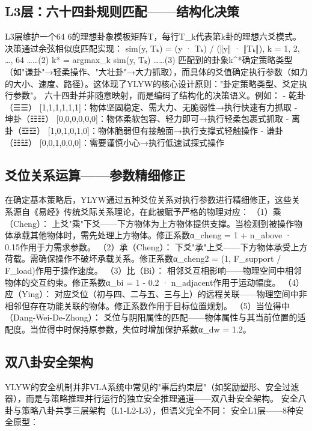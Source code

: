 \documentclass[12pt,a4paper]{article}
\begin{document}
\subsection{L3层：六十四卦规则匹配——结构化决策}
L3层维护一个64  6的理想卦象模板矩阵T，每行T\_k代表第k卦的理想六爻模式。决策通过余弦相似度匹配实现：
sim(y, Tₖ) = (y · Tₖ) / (‖y‖ · ‖Tₖ‖),  k = 1, 2, …, 64  ……(2)
k* = argmax\_k sim(y, Tₖ)  ……(3)
匹配到的卦象k^*确定策略类型（如"谦卦"→轻柔操作、"大壮卦"→大力抓取），而具体的爻值确定执行参数（如力的大小、速度、路径）。这体现了YLYW的核心设计原则："卦定策略类型、爻定执行参数"。
六十四卦并非随意映射，而是编码了结构化的决策语义。例如：
- 乾卦（☰☰） [1,1,1,1,1,1]：物体坚固稳定、需大力、无脆弱性→执行快速有力抓取
- 坤卦（☷☷） [0,0,0,0,0,0]：物体柔软包容、轻力即可→执行轻柔包裹式抓取
- 离卦（☲☲） [1,0,1,0,1,0]：物体脆弱但有接触面→执行支撑式轻触操作
- 谦卦（☷☳） [0,0,1,0,0,0]：需要谨慎小心→执行低速试探式操作

\subsection{爻位关系运算——参数精细修正}
在确定基本策略后，YLYW通过五种爻位关系对执行参数进行精细修正，这些关系源自《易经》传统爻际关系理论，在此被赋予严格的物理对应：
（1）乘（Cheng）： 上爻"乘"下爻——下方物体为上方物体提供支撑。当检测到被操作物体承载其他物体时，需先处理上方物体。修正系数α\_cheng = 1 + n\_above · 0.15作用于力需求参数。
（2）承（Cheng）： 下爻"承"上爻——下方物体承受上方荷载。需确保操作不破坏承载关系。修正系数α\_cheng2 = (1, F\_support / F\_load)作用于操作速度。
（3）比（Bi）： 相邻爻互相影响——物理空间中相邻物体的交互约束。修正系数α\_bi = 1 - 0.2 · n\_adjacent作用于运动幅度。
（4）应（Ying）： 对应爻位（初与四、二与五、三与上）的远程关联——物理空间中非相邻但存在功能关联的物体。修正系数作用于目标位置规划。
（5）当位得中（Dang-Wei-De-Zhong）： 爻位与阴阳属性的匹配——物体属性与其当前位置的适配度。当位得中时保持原参数，失位时增加保护系数α\_dw = 1.2。

\subsection{双八卦安全架构}
YLYW的安全机制并非VLA系统中常见的"事后约束层"（如奖励塑形、安全过滤器），而是与策略推理并行运行的独立安全推理通道——双八卦安全架构。
安全八卦与策略八卦共享三层架构（L1-L2-L3），但语义完全不同：
安全L1层——8种安全原型：
\end{document}
